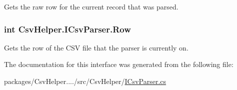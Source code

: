 Gets the raw row for the current record that was parsed. 

\hypertarget{a00089_a0ec83f976594f51a002448fa2fe2e392}{
\subsubsection[{Row}]{\setlength{\rightskip}{0pt plus 5cm}int Csv\-Helper.\-I\-Csv\-Parser.\-Row\hspace{0.3cm}{\ttfamily [get]}}}\label{a00089_a0ec83f976594f51a002448fa2fe2e392}


Gets the row of the C\-S\-V file that the parser is currently on. 



The documentation for this interface was generated from the following file\-:\begin{DoxyCompactItemize}
\item 
packages/\-Csv\-Helper..../src/\-Csv\-Helper/\hyperlink{a00210}{I\-Csv\-Parser.\-cs}\end{DoxyCompactItemize}
